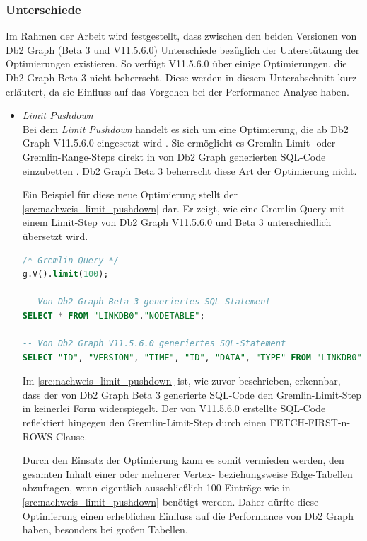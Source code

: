 \subsubsection{Unterschiede}
Im Rahmen der Arbeit wird festgestellt, dass zwischen den beiden Versionen von Db2 Graph (Beta 3 und V11.5.6.0) Unterschiede bezüglich der Unterstützung der Optimierungen existieren. So verfügt V11.5.6.0 über einige Optimierungen, die Db2 Graph Beta 3 nicht beherrscht. Diese werden in diesem Unterabschnitt kurz erläutert, da sie Einfluss auf das Vorgehen bei der Performance-Analyse haben. 
\begin{itemize}
    \item \textit{Limit Pushdown}\\
    Bei dem \textit{Limit Pushdown} handelt es sich um eine Optimierung, die ab Db2 Graph V11.5.6.0 eingesetzt wird \cite{ibm_docs_optimize}. Sie ermöglicht es Gremlin-Limit- oder Gremlin-Range-Steps direkt in von Db2 Graph generierten SQL-Code einzubetten \cite{ibm_docs_optimize}. Db2 Graph Beta 3 beherrscht diese Art der Optimierung nicht.

    Ein Beispiel für diese neue Optimierung stellt der \autoref{src:nachweis_limit_pushdown} dar. Er zeigt, wie eine Gremlin-Query mit einem Limit-Step von Db2 Graph V11.5.6.0 und Beta 3 unterschiedlich übersetzt wird.

\begin{lstlisting}[label=src:nachweis_limit_pushdown,caption={Nachweis Limit Pushdown Optimierung},language=SQL]
/* Gremlin-Query */
g.V().limit(100);

-- Von Db2 Graph Beta 3 generiertes SQL-Statement
SELECT * FROM "LINKDB0"."NODETABLE";

-- Von Db2 Graph V11.5.6.0 generiertes SQL-Statement
SELECT "ID", "VERSION", "TIME", "ID", "DATA", "TYPE" FROM "LINKDB0"."NODETABLE" FETCH FIRST 100 ROWS;
\end{lstlisting}

    Im \autoref{src:nachweis_limit_pushdown} ist, wie zuvor beschrieben, erkennbar, dass der von Db2 Graph Beta 3 generierte SQL-Code den Gremlin-Limit-Step in keinerlei Form widerspiegelt. Der von V11.5.6.0 erstellte SQL-Code reflektiert hingegen den Gremlin-Limit-Step durch einen FETCH-FIRST-n-ROWS-Clause.

    Durch den Einsatz der Optimierung kann es somit vermieden werden, den gesamten Inhalt einer oder mehrerer Vertex- beziehungsweise Edge-Tabellen abzufragen, wenn eigentlich ausschließlich 100 Einträge wie in \autoref{src:nachweis_limit_pushdown} benötigt werden. Daher dürfte diese Optimierung einen erheblichen Einfluss auf die Performance von Db2 Graph haben, besonders bei großen Tabellen.


\end{itemize}
